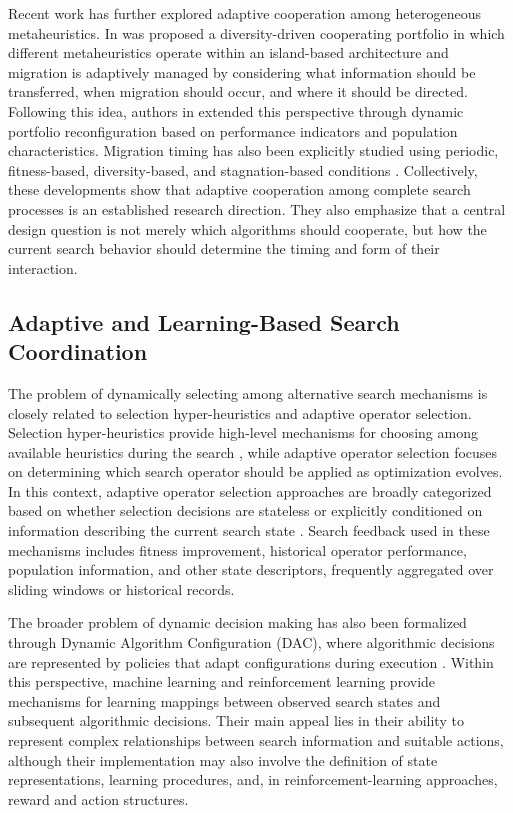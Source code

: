 \documentclass[review]{elsarticle}
\begin{document}
Recent work has further explored adaptive cooperation among heterogeneous
metaheuristics. In \cite{zychowski2025diversity} was proposed a diversity-driven cooperating portfolio in which different metaheuristics operate within an island-based
architecture and migration is adaptively managed by considering what
information should be transferred, when migration should occur, and where it
should be directed. Following this idea, authors in \cite{yao2025adaptive} extended this perspective through dynamic portfolio reconfiguration based on performance indicators and population characteristics. Migration timing has also been explicitly studied using periodic, fitness-based, diversity-based, and stagnation-based
conditions \cite{zychowski2025migration}. Collectively, these developments
show that adaptive cooperation among complete search processes is an
established research direction. They also emphasize that a central design
question is not merely which algorithms should cooperate, but how the
current search behavior should determine the timing and form of their
interaction.

\subsection{Adaptive and Learning-Based Search Coordination}
\label{subsec:adaptive_coordination}

The problem of dynamically selecting among alternative search mechanisms is
closely related to selection hyper-heuristics and adaptive operator
selection. Selection hyper-heuristics provide high-level mechanisms for
choosing among available heuristics during the search
\cite{drake2020recent}, while adaptive operator selection focuses on determining which search operator should be applied as optimization evolves. In this context, adaptive operator selection approaches are broadly categorized based on whether selection decisions are stateless or explicitly conditioned on information describing the current search state \cite{pei2025adaptive}. Search feedback used in these mechanisms includes fitness
improvement, historical operator performance, population information, and
other state descriptors, frequently aggregated over sliding windows or
historical records.

The broader problem of dynamic decision making has also been formalized
through Dynamic Algorithm Configuration (DAC), where algorithmic decisions
are represented by policies that adapt configurations during execution
\cite{adriaensen2022automated}. Within this perspective, machine learning and
reinforcement learning provide mechanisms for learning mappings between
observed search states and subsequent algorithmic decisions. Their main
appeal lies in their ability to represent complex relationships between
search information and suitable actions, although their implementation may
also involve the definition of state representations, learning procedures,
and, in reinforcement-learning approaches, reward and action structures.
\end{document}

